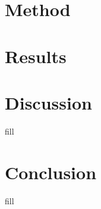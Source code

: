 \documentclass[a4paper, 11pt, twocolumn]{article}
\begin{document}
\section{Method}



\section{Results}



\section{Discussion}
fill
\section{Conclusion}
fill


\end{document}
